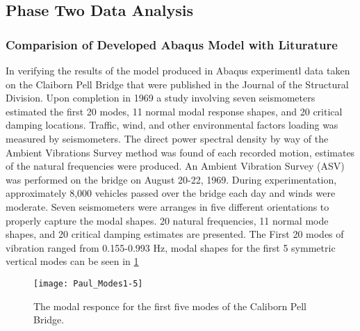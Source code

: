 \subsection{Phase Two Data Analysis}

\subsubsection{Comparision of Developed Abaqus Model with Liturature}


In verifying the results of the model produced in Abaqus experimentl data taken on the Claiborn Pell Bridge that were published in the Journal of the Structural Division. Upon completion in 1969 a study involving seven seismometers estimated the first 20 modes, 11 normal modal response shapes, and 20 critical damping locations. Traffic, wind, and other environmental factors loading was measured by seismometers. The direct power spectral density by way of the Ambient Vibrations Survey method was found of each recorded motion, estimates of the natural frequencies were produced. An Ambient Vibration Survey (ASV) was performed on the bridge on August 20-22, 1969. During experimentation, approximately 8,000 vehicles passed over the bridge each day and winds were moderate. Seven seismometers were arranges in five different orientations to properly capture the modal shapes. 20 natural frequencies, 11 normal mode shapes, and 20 critical damping estimates are presented. The First 20 modes of vibration ranged from 0.155-0.993 Hz, modal shapes for the first 5 symmetric vertical modes can be seen in \ref{fig:Paul_Modes1-5}\\

\begin{figure}

\centering

\texttt{[image: Paul\_Modes1-5]}

\caption{The modal responce for the first five modes of the Caliborn Pell Bridge.}

\label{fig:Paul_Modes1-5}

\end{figure}


